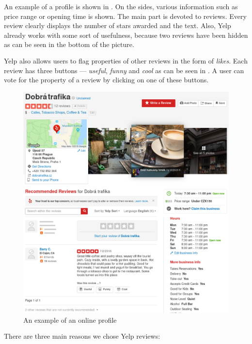 An example of a profile is shown in .
On the sides, various information such as price range or opening time is shown.
The main part is devoted to reviews.
Every review clearly displays the number of stars awarded and the text.
Also, Yelp already works with some sort of usefulness,
because two reviews have been hidden as can be seen in the bottom of the picture.

Yelp also allows users to flag properties of other reviews in the form of \emph{likes}.
Each review has three buttons --- \emph{useful}, \emph{funny} and \emph{cool} as can be seen in .
A user can vote for the property of a review by clicking on one of these buttons.

\begin{figure}[ht]\centering
\includegraphics[width=130mm]{../img/dobra_trafika.png}
\caption{An example of an online profile}
\label{fig:dobra_trafika_app}
\end{figure}

There are three main reasons we chose Yelp reviews: 

